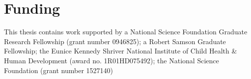 \chapter*{Funding}

This thesis contains work supported by a National Science Foundation Graduate
Research Fellowship (grant number 0946825); a Robert Samson Graduate Fellowship;
the Eunice Kennedy Shriver National Institute of Child Health & Human
Development (award no. 1R01HD075492); the National Science Foundation (grant
number 1527140)
